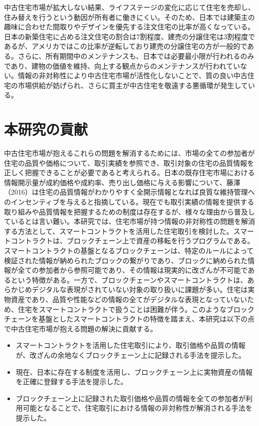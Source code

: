 \documentclass[a4paper,fontsize=11pt,report,notitlepage,line_length=38zw,number_of_lines=40,dvipdfmx]{jlreq}
\begin{document}
中古住宅市場が拡大しない結果、ライフステージの変化に応じて住宅を売却し、住み替えを行うという動因が所有者に働きにくい。そのため、日本では建築主の趣味に合わせた間取りやデザインを優先する注文住宅の比率が高くなっている。日本の新築住宅に占める注文住宅の割合は7割程度、建売の分譲住宅は3割程度であるが、アメリカではこの比率が逆転しており建売の分譲住宅の方が一般的である。さらに、所有期間中のメンテナンスも、日本では必要最小限が行われるのみであり、建物の価値を維持、向上する観点からのメンテナンスが行われていない。情報の非対称性により中古住宅市場が活性化しないことで、質の良い中古住宅の市場供給が妨げられ、さらに買主が中古住宅を敬遠する悪循環が発生している。

\section{本研究の貢献}
中古住宅市場が抱えるこれらの問題を解消するためには、市場の全ての参加者が住宅の品質や価格について、取引実績を参照でき、取引対象の住宅の品質情報を正しく把握できることが必要であると考えられる。日本の既存住宅市場における情報開示量が成約価格や成約率、売り出し価格に与える影響について、藤澤（2016）\cite{fujisawa2016}は住宅の品質情報がわかりやすく全開示情報となれば良質な維持管理へのインセンティブを与えると指摘している。現在でも取引実績の情報を提供する取り組みや品質情報を把握するための制度は存在するが、様々な理由から普及しているとは言い難い。本研究では、住宅市場が持つ情報の非対称性の問題を解消する方法として、スマートコントラクトを活用した住宅取引を検討した。スマートコントラクトは、ブロックチェーン上で資産の移転を行うプログラムである。スマートコントラクトの基盤となるブロックチェーンは、特定のルールによって検証された情報が納められたブロックの繋がりであり、ブロックに納められた情報が全ての参加者から参照可能であり、その情報は現実的に改ざんが不可能であるという特徴がある。一方で、ブロックチェーンやスマートコントラクトは、あらかじめデジタルな表現がされていない対象の取り扱いに課題が多い。住宅は実物資産であり、品質や性能などの情報の全てがデジタルな表現となっていないため、住宅をスマートコントラクトで扱うことは困難が伴う。このようなブロックチェーンを基盤としたスマートコントラクトの特徴を踏まえ、本研究は以下の点で中古住宅市場が抱える問題の解決に貢献する。
\begin{itemize}
\item スマートコントラクトを活用した住宅取引により、取引価格や品質の情報が、改ざんの余地なくブロックチェーン上に記録される手法を提示した。
\item 現在、日本に存在する制度を活用し、ブロックチェーン上に実物資産の情報を正確に登録する手法を提示した。
\item ブロックチェーン上に記録された取引価格や品質の情報を全ての参加者が利用可能となることで、住宅取引における情報の非対称性が解消される手法を提示した。
\end{itemize}
\end{document}
